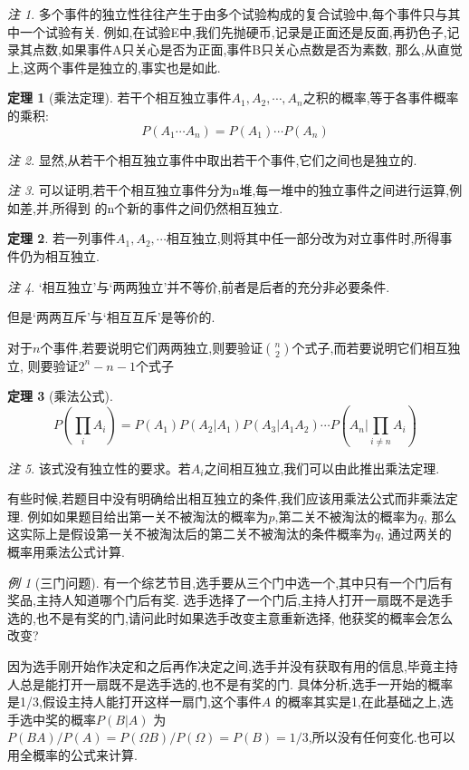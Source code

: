 \documentclass[a4paper,11pt]{article}%
\theoremstyle{remark}
\newtheorem*{remark}{注}
\theoremstyle{remark}
\newtheorem*{example}{例}
\theoremstyle{definition}
\newtheorem{theorem}{定理}[section]
\theoremstyle{definition}
\theoremstyle{plain}
\begin{document}
\begin{remark}
    多个事件的独立性往往产生于由多个试验构成的复合试验中,每个事件只与其中一个试验有关.
    例如,在试验E中,我们先抛硬币,记录是正面还是反面,再扔色子,记录其点数,如果事件A只关心是否为正面,事件B只关心点数是否为素数,
    那么,从直觉上,这两个事件是独立的,事实也是如此.
\end{remark}
\begin{theorem}[乘法定理]
    若干个相互独立事件$A_1,A_2,\cdots,A_n$之积的概率,等于各事件概率的乘积:
    \[P(A_1\cdots A_n)=P(A_1)\cdots P(A_n)\]
\end{theorem}
\begin{remark}
    显然,从若干个相互独立事件中取出若干个事件,它们之间也是独立的.
\end{remark}
\begin{remark}
    可以证明,若干个相互独立事件分为n堆,每一堆中的独立事件之间进行运算,例如差,并,所得到
    的n个新的事件之间仍然相互独立.
\end{remark}
\begin{theorem}
    若一列事件$A_1,A_2,\cdots$相互独立,则将其中任一部分改为对立事件时,所得事件仍为相互独立.
\end{theorem}
\begin{remark}
    `相互独立'与`两两独立'并不等价,前者是后者的充分非必要条件.

    但是`两两互斥'与`相互互斥'是等价的.

    对于$n$个事件,若要说明它们两两独立,则要验证$\binom{n}{2}$个式子,而若要说明它们相互独立,
    则要验证$2^n-n-1$个式子
\end{remark}
\begin{theorem}[乘法公式]
   \[P(\prod_iA_i)=P(A_1)P(A_2|A_1)P(A_3|A_1A_2)\cdots P(A_n|\prod_{i\neq n}A_i)\] 
\end{theorem}
\begin{remark}
    该式没有独立性的要求。若$A_i$之间相互独立,我们可以由此推出乘法定理.

    有些时候,若题目中没有明确给出相互独立的条件,我们应该用乘法公式而非乘法定理.
    例如如果题目给出第一关不被淘汰的概率为$p$,第二关不被淘汰的概率为$q$,
    那么这实际上是假设第一关不被淘汰后的第二关不被淘汰的条件概率为$q$,
    通过两关的概率用乘法公式计算.
\end{remark}
\begin{example}[三门问题]
   有一个综艺节目,选手要从三个门中选一个,其中只有一个门后有奖品,主持人知道哪个门后有奖.
   选手选择了一个门后,主持人打开一扇既不是选手选的,也不是有奖的门,请问此时如果选手改变主意重新选择,
   他获奖的概率会怎么改变?
   
   因为选手刚开始作决定和之后再作决定之间,选手并没有获取有用的信息,毕竟主持人总是能打开一扇既不是选手选的,也不是有奖的门.
   具体分析,选手一开始的概率是1/3,假设主持人能打开这样一扇门,这个事件$A$ 的概率其实是1,在此基础之上,选手选中奖的概率$P(B|A)$
   为$P(BA)/P(A)=P(\Omega B)/P(\Omega)=P(B)=1/3$,所以没有任何变化.也可以用全概率的公式来计算.
\end{example}
\end{document}

